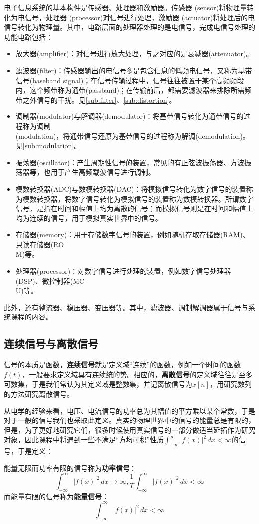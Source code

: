 \documentclass{ctexbook}
\begin{document}
电子信息系统的基本构件是传感器、处理器和激励器。传感器 (sensor)将物理量转化为电信号，处理器 (processor)对信号进行处理，激励器 (actuator)将处理后的电信号转化为物理量。其中，电路层面的处理器处理的是电信号，完成电信号处理的功能电路包括：\begin{itemize}
    \item 放大器(amplifier)：对信号进行放大处理，与之对应的是衰减器(attenuator)。
    \item 滤波器(filter)：传感器输出的电信号多是包含信息的低频电信号，又称为基带信号(baseband signal)；在信号传输过程中，信号往往被置于某个高频频段内，这个频带称为通带(passband)；在传输前后，都需要滤波器来排除所需频带之外信号的干扰。见\ref{sub:filter}、\ref{sub:distortion}。
    \item 调制器(modulator)与解调器(demodulator)：将基带信号转化为通带信号的过程称为调制\\
    (modulation)，将通带信号还原为基带信号的过程称为解调(demodulation)。见\ref{sub:modulation}。
    \item 振荡器(oscillator)：产生周期性信号的装置，常见的有正弦波振荡器、方波振荡器等，也用于产生高频载波信号进行调制。
    \item 模数转换器(ADC)与数模转换器(DAC)：将模拟信号转化为数字信号的装置称为模数转换器，将数字信号转化为模拟信号的装置称为数模转换器。所谓数字信号，是指在时间和幅值上均为离散的信号；而模拟信号则是在时间和幅值上均为连续的信号，用于模拟真实世界中的信号。
    \item 存储器(memory)：用于存储数字信号的装置，例如随机存取存储器(RAM)、只读存储器(RO\\
    M)等。
    \item 处理器(processor)：对数字信号进行处理的装置，例如数字信号处理器(DSP)、微控制器(MC\\
    U)等。
\end{itemize}
此外，还有整流器、稳压器、变压器等。其中，滤波器、调制解调器属于信号与系统课程的内容。

\subsection{连续信号与离散信号}\label{sub:signal}
信号的本质是函数，\textbf{连续信号}就是定义域“连续”的函数，例如一个时间的函数$f(t)$，一般要求定义域具有连续统的势。相应的，\textbf{离散信号}的定义域往往是至多可数集，于是我们常认为其定义域是整数集，并记离散信号为$x[n]$，用研究数列的方法研究离散信号。

从电学的经验来看，电压、电流信号的功率总为其幅值的平方乘以某个常数，于是对于一般的信号我们也采取此定义。真实的物理世界中的信号的能量总是有限的，但是，为了更好地研究它们，很多时候使用真实信号的一部分做适当延拓作为研究对象，因此课程中将遇到一些不满足“方均可积”性质$\int_{-\infty}^{\infty}| f(x)| ^2\,dx<\infty$的信号，于是定义：
\begin{definition}[功率信号与能量信号]
能量无限而功率有限的信号称为\textbf{功率信号}：\[\int_{-\infty}^{\infty}| f(x)| ^2\,dx\to\infty,\frac{1}{T}\int_{-\infty}^{\infty}| f(x)|^2  \,dx<\infty\]
而能量有限的信号称为\textbf{能量信号}：\[\int_{-\infty}^{\infty}| f(x)| ^2\,dx<\infty\]
\end{definition}
\end{document}
